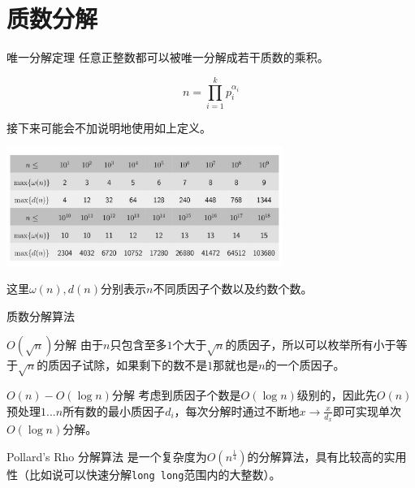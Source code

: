 \documentclass{beamer}
\begin{document}
\section{质数分解}
\begin{frame}{唯一分解定理}
	任意正整数都可以被唯一分解成若干质数的乘积。
	
	$$n = \prod_{i=1}^k p_i^{\alpha_i}$$
	
	接下来可能会不加说明地使用如上定义。
		
	\begin{center}
		\includegraphics[width=9.0cm]{biao.jpg}
	\end{center}

	这里$\omega(n), d(n)$分别表示$n$不同质因子个数以及约数个数。
\end{frame}
\begin{frame}{质数分解算法}
	\begin{block}{$O(\sqrt n)$分解}
		由于$n$只包含至多$1$个大于$\sqrt n$的质因子，所以可以枚举所有小于等于$\sqrt n$的质因子试除，如果剩下的数不是$1$那就也是$n$的一个质因子。
	\end{block}
	\begin{block}{$O(n)-O(\log n)$分解}
		考虑到质因子个数是$O(\log n)$级别的，因此先$O(n)$预处理$1...n$所有数的最小质因子$d_i$，每次分解时通过不断地$x \to \frac{x}{d_x}$即可实现单次$O(\log n)$分解。
	\end{block}
	\begin{block}{Pollard's Rho 分解算法}
		是一个复杂度为$O(n^{\frac14})$的分解算法，具有比较高的实用性（比如说可以快速分解\texttt{long long}范围内的大整数）。
	\end{block}
\end{frame}
\end{document}
